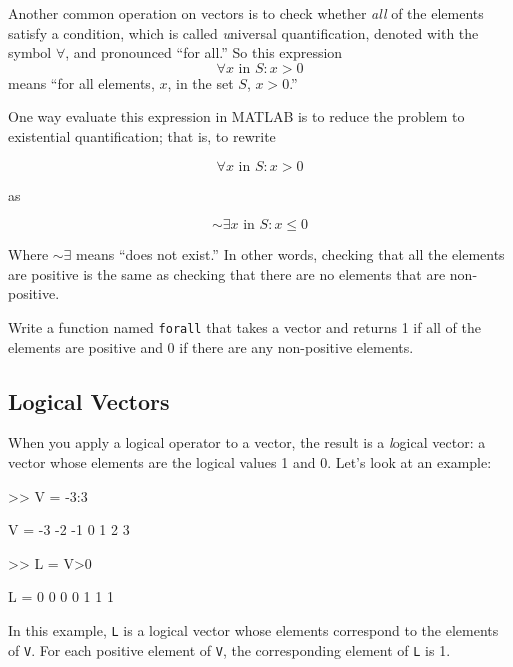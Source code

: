 Another common operation on vectors is to check whether {\em all}
of the elements satisfy a condition, which is called {\emph universal quantification}, denoted with
the symbol $\forall$, and pronounced ``for all.''  So this
expression
%
\[ \forall x \mbox{~in~} S: x>0 \]
%
means ``for all elements, $x$, in the set $S$, $x>0$.''

One way evaluate this expression in MATLAB is to reduce the problem to
existential quantification; that is, to rewrite

\begin{equation}
\forall x \mbox{~in~} S: x>0
\end{equation}

as

\begin{equation}
\sim \exists x \mbox{~in~} S: x \le 0
\end{equation}

Where $\sim \exists$ means ``does not exist.''
In other words, checking that all the elements are positive is
the same as checking that there are no elements
that are non-positive.

\begin{ex}
Write a function named {\tt forall} that
takes a vector and returns 1 if all of the elements are positive
and 0 if there are any non-positive elements.
\end{ex}




\subsection{Logical Vectors}

When you apply a logical operator to a vector, the result is a 
{\emph logical vector}: a vector whose elements are the logical
values 1 and 0. Let's look at an example:


\begin{code}
>> V = -3:3

V = -3    -2    -1     0     1     2     3

>> L = V>0

L =  0     0     0     0     1     1     1
\end{code}

In this example, {\tt L} is a logical vector whose elements
correspond to the elements of {\tt V}.  For each positive element of
{\tt V}, the corresponding element of {\tt L} is 1.

